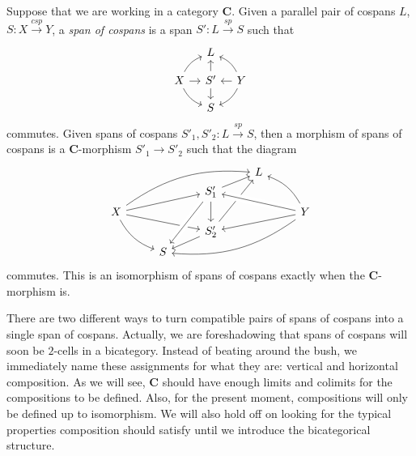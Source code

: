 \documentclass[11pt]{amsart}
\newcommand{\cat}[1]{\mathbf{#1}}
\newcommand{\from}{\colon}
\renewcommand{\span}{\xrightarrow{\mathit{sp}}}
\newcommand{\cospan}{\xrightarrow{\mathit{csp}}}
\theoremstyle{remark}
\theoremstyle{definition}
\begin{document}
Suppose that we are working in a category $\cat{C}$. Given a parallel pair of cospans $L$, $S \from X \cospan Y$, a \emph{span of cospans} is a span $S' \from L \span S$ such that
\[
\begin{tikzcd}[column sep=1em,row sep=1em]
	{} &
	{L} &
	{} \\
	{X} 
		\ar[bend left=20,ru]
		\ar[r]
		\ar[bend right=20,rd] &
	{S'} 
		\ar[u]
		\ar[d] &
	{Y} 
		\ar[bend right=20,lu]
		\ar[l]
		\ar[bend left=20,ld] \\
	{} &
	{S} &
	{} 
\end{tikzcd}
\]
commutes. Given spans of cospans $S'_1,S'_2 \from L \span S$, then a morphism of spans of cospans is a $\cat{C}$-morphism $S'_1 \to S'_2$ such that the diagram
%
\begin{equation} 
\label{diag.2-cell iso}
\begin{tikzcd}[column sep=2.5em,row sep=.2em]
 {} & 
 {} & 
 {} & 
 {L} & 
 {} \\
 {} & 
 {} & 
 {S'_1} 
	 \ar[ur]
	 \ar[dd]& 
 {} & 
 {} \\
 {X} 
	 \ar[uurrr, bend left=20]
	 \ar[urr]
	 \ar[drr]
	 \ar[ddr, bend right=20] & 
 {} & 
 {} & 
 {} & 
 {Y} 
	 \ar[uul, bend right=20]
	 \ar[dll]
	 \ar[ddlll, bend left=20] \\
 {} & 
 {} & 
 {S'_2} 
	 \ar[uuur]
	 \ar[ld]& 
 {} & 
 {} \\
 {} & 
 {S} & 
 {} & 
 {} & 
 {} 
	 \ar[from=2-3,to=5-2,crossing over] 
	 \ar[from=3-5,to=2-3,crossing over]
 \end{tikzcd}
 \end{equation}
commutes. This is an isomorphism of spans of  cospans exactly when the  $\cat{C}$-morphism is.

There are two different ways to turn compatible pairs of spans of cospans into a single span of cospans.  Actually, we are foreshadowing that spans of cospans will soon be $2$-cells in a bicategory. Instead of beating around the bush, we immediately name these assignments for what they are: vertical and horizontal composition. As we will see, $\cat{C}$ should have enough limits and colimits for the compositions to be defined. Also, for the present moment, compositions will only be defined up to isomorphism. We will also hold off on looking for the typical properties composition should satisfy until we introduce the bicategorical structure. 
\end{document}
